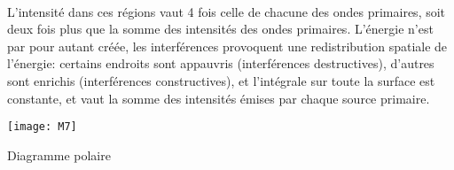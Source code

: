 \\

L'intensité dans ces régions vaut 4 fois celle de chacune des ondes primaires, soit deux fois plus que la somme des intensités des ondes primaires. L'énergie n'est par pour autant créée, les interférences provoquent une redistribution spatiale de l'énergie: certains endroits sont appauvris (interférences destructives), d'autres sont enrichis (interférences constructives), et l'intégrale sur toute la surface est constante, et vaut la somme des intensités émises par chaque source primaire.

\begin{marginfigure}[6cm]
	\texttt{[image: M7]}
	\caption{Diagramme polaire}
	\label{fm7}
\end{marginfigure}

